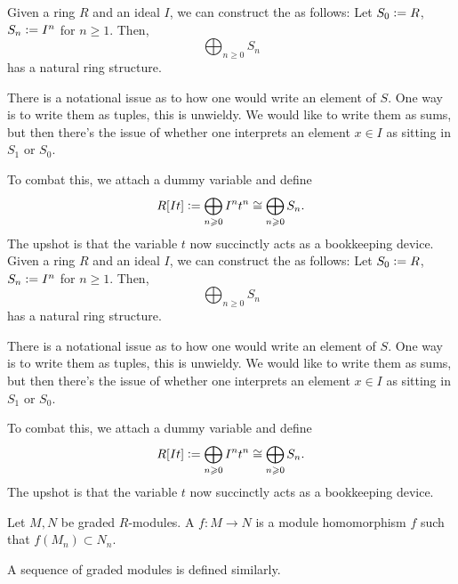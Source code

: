 \documentclass[12pt]{article}
\begin{document}
\begin{ex} \label{ex:rees-algebra}
	Given a ring $R$ and an ideal $I$, we can construct the  as follows: \newline
	Let $S_{0} \vcentcolon= R$, $S_{n} \vcentcolon= I^{n}$ for $n \ge 1$. Then,
	\begin{equation*} 
		\bigoplus_{n \ge 0} S_{n}
	\end{equation*}
	has a natural ring structure.

	There is a notational issue as to how one would write an element of $S$. One way is to write them as tuples, this is unwieldy. We would like to write them as sums, but then there's the issue of whether one interprets an element $x \in I$ as sitting in $S_{1}$ or $S_{0}$. 

	To combat this, we attach a dummy variable and define
	\begin{equation*} 
		R[It] \vcentcolon= \bigoplus_{n \ge 0} I^{n} t^{n} \cong \bigoplus_{n \ge 0} S_{n}.
	\end{equation*}
	The upshot is that the variable $t$ now succinctly acts as a bookkeeping device. Given a ring $R$ and an ideal $I$, we can construct the  as follows: \newline
	Let $S_{0} \vcentcolon= R$, $S_{n} \vcentcolon= I^{n}$ for $n \ge 1$. Then,
	\begin{equation*} 
		\bigoplus_{n \ge 0} S_{n}
	\end{equation*}
	has a natural ring structure.

	There is a notational issue as to how one would write an element of $S$. One way is to write them as tuples, this is unwieldy. We would like to write them as sums, but then there's the issue of whether one interprets an element $x \in I$ as sitting in $S_{1}$ or $S_{0}$. 

	To combat this, we attach a dummy variable and define
	\begin{equation*} 
		R[It] \vcentcolon= \bigoplus_{n \ge 0} I^{n} t^{n} \cong \bigoplus_{n \ge 0} S_{n}.
	\end{equation*}
	The upshot is that the variable $t$ now succinctly acts as a bookkeeping device.
\end{ex}

\begin{defn}
	Let $M, N$ be graded $R$-modules. A  $f : M \to N$ is a module homomorphism $f$ such that $f(M_{n}) \subset N_{n}$. 

	A sequence of graded modules is defined similarly.
\end{defn}
\end{document}
